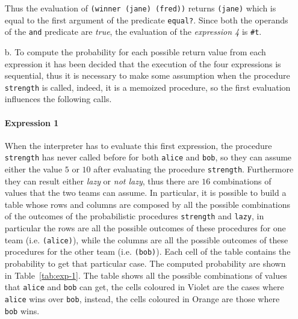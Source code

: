 \begin{itemize}
        Thus the evaluation of \texttt{(winner \textquotesingle(jane) \textquotesingle(fred))} returns \texttt{\textquotesingle(jane)} which is equal to the first argument of the
        predicate \texttt{equal?}. Since both the operands of the \texttt{and} predicate are \textit{true}, the evaluation of the
        \textit{expression 4} is \texttt{\#t}.

    \item[b.] To compute the probability for each possible return value from each expression it has been decided that the execution
        of the four expressions is sequential, thus it is necessary to make some assumption when the procedure \texttt{strength} is
        called, indeed, it is a memoized procedure, so the first evaluation influences the following calls.

        \paragraph*{Expression 1} When the interpreter has to evaluate this first expression, the procedure \texttt{strength} has never 
        called before for both \texttt{\textquotesingle alice} and \texttt{\textquotesingle bob}, so they can assume either the value $5$ or $10$ after evaluating
        the procedure \texttt{strength}. Furthermore they can result either \textit{lazy} or \textit{not lazy}, thus there are
        $16$ combinations of values that the two teams can assume.
        In particular, it is possible to build a table whose rows and columns are composed by all the possible combinations of
        the outcomes of the probabilistic procedures \texttt{strength} and \texttt{lazy}, in particular
        the rows are all the possible outcomes of these procedures for one team (i.e. \texttt{\textquotesingle (alice)}), 
        while the columns are all the possible outcomes of these procedures for the other team (i.e. \texttt{\textquotesingle (bob)}).
        Each cell of the table contains the probability to get that particular case. The computed probability are shown
        in Table~\ref{tab:exp-1}.
        The table shows all the possible combinations of values that \texttt{\textquotesingle alice} and \texttt{\textquotesingle bob} can get, the cells coloured
        in Violet are the cases where \texttt{\textquotesingle alice} wins over \texttt{\textquotesingle bob}, instead, the cells coloured in Orange are those
        where \texttt{\textquotesingle bob} wins.


\end{itemize}
